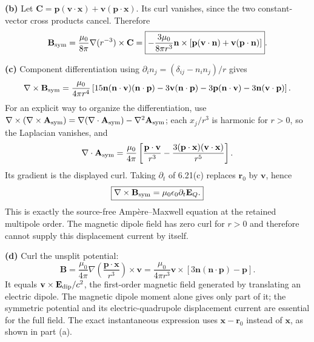 \textbf{(b)} Let $\mathbf C=\mathbf p(\mathbf v\cdot\mathbf x)
+\mathbf v(\mathbf p\cdot\mathbf x)$. Its curl vanishes, since the two
constant-vector cross products cancel. Therefore
\[
\mathbf B_{\rm sym}=\frac{\mu_0}{8\pi}\nabla(r^{-3})\times\mathbf C
=\boxed{-\frac{3\mu_0}{8\pi r^3}\mathbf n\times
[\mathbf p(\mathbf v\cdot\mathbf n)+\mathbf v(\mathbf p\cdot\mathbf n)]}.
\]

\textbf{(c)} Component differentiation using
$\partial_i n_j=(\delta_{ij}-n_in_j)/r$ gives
\[
\nabla\times\mathbf B_{\rm sym}
=\frac{\mu_0}{4\pi r^4}\left[
15\mathbf n(\mathbf n\cdot\mathbf v)(\mathbf n\cdot\mathbf p)
-3\mathbf v(\mathbf n\cdot\mathbf p)-3\mathbf p(\mathbf n\cdot\mathbf v)
-3\mathbf n(\mathbf v\cdot\mathbf p)\right].
\]
For an explicit way to organize the differentiation, use
$\nabla\times(\nabla\times\mathbf A_{\rm sym})
=\nabla(\nabla\cdot\mathbf A_{\rm sym})-\nabla^2\mathbf A_{\rm sym}$;
each $x_j/r^3$ is harmonic for $r>0$, so the Laplacian vanishes, and
\[
\nabla\cdot\mathbf A_{\rm sym}
=\frac{\mu_0}{4\pi}\left[
\frac{\mathbf p\cdot\mathbf v}{r^3}
-\frac{3(\mathbf p\cdot\mathbf x)(\mathbf v\cdot\mathbf x)}{r^5}\right].
\]
Its gradient is the displayed curl. Taking $\partial_t$ of 6.21(c)
replaces $\mathbf r_0$ by $\mathbf v$, hence
\[
\boxed{\nabla\times\mathbf B_{\rm sym}=\mu_0\epsilon_0\partial_t\mathbf E_Q.}
\]
This is exactly the source-free Amp\`ere--Maxwell equation at the retained
multipole order. The magnetic dipole field has zero curl for $r>0$ and
therefore cannot supply this displacement current by itself.

\textbf{(d)} Curl the unsplit potential:
\[
\mathbf B=\frac{\mu_0}{4\pi}\nabla\left(\frac{\mathbf p\cdot\mathbf x}{r^3}\right)
\times\mathbf v
=\boxed{\frac{\mu_0}{4\pi r^3}\mathbf v\times
[3\mathbf n(\mathbf n\cdot\mathbf p)-\mathbf p]}.
\]
It equals $\mathbf v\times\mathbf E_{\rm dip}/c^2$, the first-order
magnetic field generated by translating an electric dipole. The magnetic
dipole moment alone gives only part of it; the symmetric potential and
its electric-quadrupole displacement current are essential for the full
field. The exact instantaneous expression uses $\mathbf x-\mathbf r_0$
instead of $\mathbf x$, as shown in part (a).

